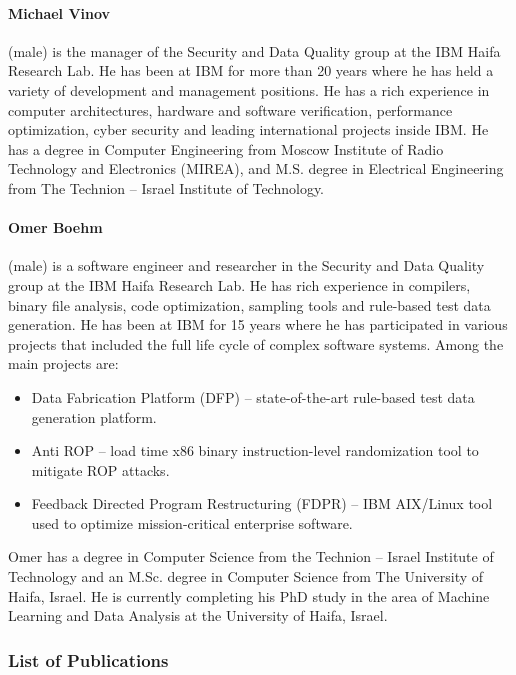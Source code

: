 \documentclass[a4paper,11pt]{article}
\begin{document}
\paragraph{Michael Vinov} (male) is the manager of the Security and Data Quality group at the IBM Haifa Research Lab. He has been at IBM for more than 20 years where he has held a variety of development and management positions. He has a rich experience in computer architectures, hardware and software verification, performance optimization, cyber security and leading international projects inside IBM. He has a degree in Computer Engineering from Moscow Institute of Radio Technology and Electronics (MIREA), and M.S. degree in Electrical Engineering from The Technion -- Israel Institute of Technology.

\paragraph{Omer Boehm} (male) is a software engineer and researcher in the Security and Data Quality group at the IBM Haifa Research Lab. He has rich experience in compilers, binary file analysis, code optimization, sampling tools and rule-based test data generation. He has been at IBM for 15 years where he has participated in various projects that included the full life cycle of complex software systems. Among the main projects are:
\begin{itemize}
\item Data Fabrication Platform (DFP) – state-of-the-art rule-based test data generation platform.
\item Anti ROP – load time x86 binary instruction-level randomization tool to mitigate ROP attacks.
\item Feedback Directed Program Restructuring (FDPR) – IBM AIX/Linux tool used to optimize mission-critical enterprise software.
\end{itemize}
Omer has a degree in Computer Science from the Technion -- Israel Institute of Technology and an M.Sc. degree in Computer Science from The University of Haifa, Israel. He is currently completing his PhD study in the area of Machine Learning and Data Analysis at the University of Haifa, Israel.

\subsubsection*{List of Publications}
\end{document}
